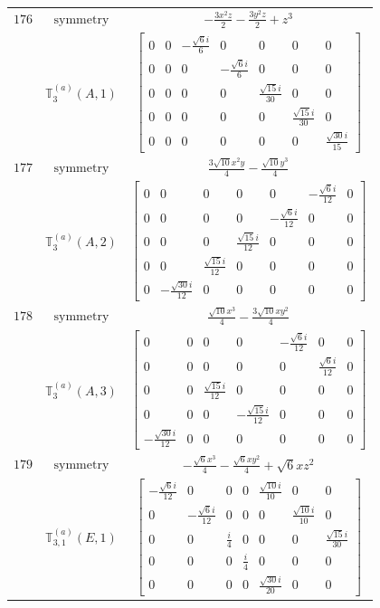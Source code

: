 \documentclass[fleqn,8pt,landscape]{jsarticle}
\begin{document}
\begin{longtable}{ccc}
$ 176 $ & $ \text{symmetry} $ & $ - \frac{3 x^{2} z}{2} - \frac{3 y^{2} z}{2} + z^{3} $ \\
$  $ & $ \mathbb{T}_{3}^{(a)}(A,1) $ & $ \begin{bmatrix} 0 & 0 & - \frac{\sqrt{6} i}{6} & 0 & 0 & 0 & 0 \\ 0 & 0 & 0 & - \frac{\sqrt{6} i}{6} & 0 & 0 & 0 \\ 0 & 0 & 0 & 0 & \frac{\sqrt{15} i}{30} & 0 & 0 \\ 0 & 0 & 0 & 0 & 0 & \frac{\sqrt{15} i}{30} & 0 \\ 0 & 0 & 0 & 0 & 0 & 0 & \frac{\sqrt{30} i}{15} \end{bmatrix} $ \\ \hline
$ 177 $ & $ \text{symmetry} $ & $ \frac{3 \sqrt{10} x^{2} y}{4} - \frac{\sqrt{10} y^{3}}{4} $ \\
$  $ & $ \mathbb{T}_{3}^{(a)}(A,2) $ & $ \begin{bmatrix} 0 & 0 & 0 & 0 & 0 & - \frac{\sqrt{6} i}{12} & 0 \\ 0 & 0 & 0 & 0 & - \frac{\sqrt{6} i}{12} & 0 & 0 \\ 0 & 0 & 0 & \frac{\sqrt{15} i}{12} & 0 & 0 & 0 \\ 0 & 0 & \frac{\sqrt{15} i}{12} & 0 & 0 & 0 & 0 \\ 0 & - \frac{\sqrt{30} i}{12} & 0 & 0 & 0 & 0 & 0 \end{bmatrix} $ \\ \hline
$ 178 $ & $ \text{symmetry} $ & $ \frac{\sqrt{10} x^{3}}{4} - \frac{3 \sqrt{10} x y^{2}}{4} $ \\
$  $ & $ \mathbb{T}_{3}^{(a)}(A,3) $ & $ \begin{bmatrix} 0 & 0 & 0 & 0 & - \frac{\sqrt{6} i}{12} & 0 & 0 \\ 0 & 0 & 0 & 0 & 0 & \frac{\sqrt{6} i}{12} & 0 \\ 0 & 0 & \frac{\sqrt{15} i}{12} & 0 & 0 & 0 & 0 \\ 0 & 0 & 0 & - \frac{\sqrt{15} i}{12} & 0 & 0 & 0 \\ - \frac{\sqrt{30} i}{12} & 0 & 0 & 0 & 0 & 0 & 0 \end{bmatrix} $ \\ \hline
$ 179 $ & $ \text{symmetry} $ & $ - \frac{\sqrt{6} x^{3}}{4} - \frac{\sqrt{6} x y^{2}}{4} + \sqrt{6} x z^{2} $ \\
$  $ & $ \mathbb{T}_{3,1}^{(a)}(E,1) $ & $ \begin{bmatrix} - \frac{\sqrt{6} i}{12} & 0 & 0 & 0 & \frac{\sqrt{10} i}{10} & 0 & 0 \\ 0 & - \frac{\sqrt{6} i}{12} & 0 & 0 & 0 & \frac{\sqrt{10} i}{10} & 0 \\ 0 & 0 & \frac{i}{4} & 0 & 0 & 0 & \frac{\sqrt{15} i}{30} \\ 0 & 0 & 0 & \frac{i}{4} & 0 & 0 & 0 \\ 0 & 0 & 0 & 0 & \frac{\sqrt{30} i}{20} & 0 & 0 \end{bmatrix} $ \\ \hline

\end{longtable}
\end{document}
